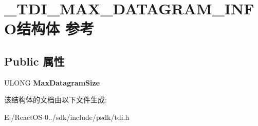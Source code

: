 \hypertarget{struct___t_d_i___m_a_x___d_a_t_a_g_r_a_m___i_n_f_o}{}\section{\+\_\+\+T\+D\+I\+\_\+\+M\+A\+X\+\_\+\+D\+A\+T\+A\+G\+R\+A\+M\+\_\+\+I\+N\+F\+O结构体 参考}
\label{struct___t_d_i___m_a_x___d_a_t_a_g_r_a_m___i_n_f_o}
\subsection*{Public 属性}
\begin{DoxyCompactItemize}
\item 
\mbox{\label{struct___t_d_i___m_a_x___d_a_t_a_g_r_a_m___i_n_f_o_af07c255c2f5adcbf56d02e78d335a591}} 
U\+L\+O\+NG {\bfseries Max\+Datagram\+Size}
\end{DoxyCompactItemize}


该结构体的文档由以下文件生成\+:\begin{DoxyCompactItemize}
\item 
E\+:/\+React\+O\+S-\/0../sdk/include/psdk/tdi.\+h\end{DoxyCompactItemize}
